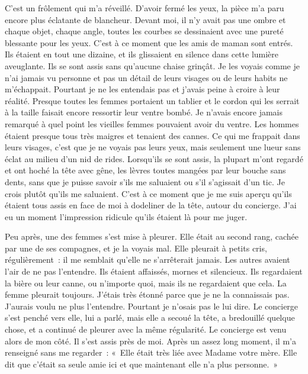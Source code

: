 \documentclass[french,twoside]{book} %
\begin{document}
C'est un frôlement qui m’a réveillé. D'avoir fermé les yeux, la pièce m’a paru encore plus éclatante de blancheur. Devant moi, il n’y avait pas une ombre et chaque objet, chaque angle, toutes les courbes se dessinaient avec une pureté blessante pour les yeux. C'est à ce moment que les amis de maman sont entrés. Ils étaient en tout une dizaine, et ils glissaient en silence dans cette lumière aveuglante. Ils se sont assis sans qu’aucune chaise grinçât. Je les voyais comme je n’ai jamais vu personne et pas un détail de leurs visages ou de leurs habits ne m’échappait. Pourtant je ne les entendais pas et j’avais peine à croire à leur réalité. Presque toutes les femmes portaient un tablier et le cordon qui les serrait à la taille faisait encore ressortir leur ventre bombé. Je n’avais encore jamais remarqué à quel point les vieilles femmes pouvaient avoir du ventre. Les hommes étaient presque tous très maigres et tenaient des cannes. Ce qui me frappait dans leurs visages, c’est que je ne voyais pas leurs yeux, mais seulement une lueur sans éclat au milieu d’un nid de rides. Lorsqu’ils se sont assis, la plupart m’ont regardé et ont hoché la tête avec gêne, les lèvres toutes mangées par leur bouche sans dents, sans que je puisse savoir s’ils me saluaient ou s’il s’agissait d’un tic. Je crois plutôt qu’ils me saluaient. C'est à ce moment que je me suis aperçu qu’ils étaient tous assis en face de moi à dodeliner de la tête, autour du concierge. J'ai eu un moment l’impression ridicule qu’ils étaient là pour me juger.\par
Peu après, une des femmes s’est mise à pleurer. Elle était au second rang, cachée par une de ses compagnes, et je la voyais mal. Elle pleurait à petits cris, régulièrement : il me semblait qu’elle ne s’arrêterait jamais. Les autres avaient l’air de ne pas l’entendre. Ils étaient affaissés, mornes et silencieux. Ils regardaient la bière ou leur canne, ou n’importe quoi, mais ils ne regardaient que cela. La femme pleurait toujours. J'étais très étonné parce que je ne la connaissais pas. J'aurais voulu ne plus l’entendre. Pourtant je n’osais pas le lui dire. Le concierge s’est penché vers elle, lui a parlé, mais elle a secoué la tête, a bredouillé quelque chose, et a continué de pleurer avec la même régularité. Le concierge est venu alors de mon côté. Il s’est assis près de moi. Après un assez long moment, il m’a renseigné sans me regarder : « Elle était très liée avec Madame votre mère. Elle dit que c’était sa seule amie ici et que maintenant elle n’a plus personne. »\par
\end{document}
